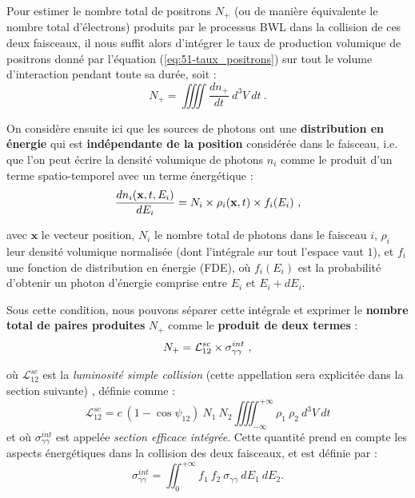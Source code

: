 \begin{refsection}
Pour estimer le nombre total de positrons $N_+$ (ou de manière équivalente le nombre total d'électrons) produits par le processus BWL dans la collision de ces deux faisceaux, il nous suffit alors d'intégrer le taux de production volumique de positrons donné par l'équation (\ref{eq:51-taux_positrons}) sur tout le volume d'interaction pendant toute sa durée, soit :
\begin{equation}
N_+ = \iiiint \dfrac{d n_+}{dt} ~ d^3V ~ dt ~ .
\end{equation}

On considère ensuite ici que les sources de photons ont une \textbf{distribution en énergie} qui est \textbf{indépendante de la position} considérée dans le faisceau, i.e. que l'on peut écrire la densité volumique de photons $n_i$ comme le produit d'un terme spatio-temporel avec un terme énergétique :
\begin{equation}
    \dfrac{dn_i(\textbf{x}, t, E_i)}{dE_i} = N_i \times \rho_i (\textbf{x}, t) \times f_i (E_i) ~ \rm ,
\end{equation}

avec $\textbf{x}$ le vecteur position, $N_i$ le nombre total de photons dans le faisceau $i$, $\rho_i$ leur densité volumique normalisée (dont l'intégrale sur tout l'espace vaut $1$), et $f_i$ une fonction de distribution en énergie (FDE), où $f_i(E_i)$ est la probabilité d'obtenir un photon d'énergie comprise entre $E_i$ et $E_i+dE_i$.

Sous cette condition, nous pouvons séparer cette intégrale et exprimer le \textbf{nombre total de paires produites} $N_+$ comme le \textbf{produit de deux termes} :
\begin{equation}
    N_+ = \mathcal{L}_{12}^{sc} \times \sigma_{\gamma\gamma}^{int} ~ \rm ,
    \label{eq:51-N+_definition}
\end{equation}

où $\mathcal{L}_{12}^{sc}$ est la \textit{luminosité simple collision} (cette appellation sera explicitée dans la section suivante) \parencite{herr_2006}, définie comme :
\begin{equation}
    \mathcal{L}_{12}^{sc} = c ~ (1-\cos{\psi_{12}}) ~ N_1 ~ N_2 \iiiint_{-\infty}^{+\infty} \rho_1 ~ \rho_2 ~ d^3 V ~ dt
    \label{eq:51-luminosite_definition}
\end{equation}
et où $\sigma_{\gamma\gamma}^{int}$ est appelée \textit{section efficace intégrée}. Cette quantité prend en compte les aspects énergétiques dans la collision des deux faisceaux, et est définie par :
\begin{equation}
    \sigma_{\gamma\gamma}^{int} = \iint_{0}^{+\infty} f_1 ~ f_2 ~ \sigma_{\gamma\gamma} ~ dE_1 ~ dE_2.
    \label{eq:51-sigma_int_definition}
\end{equation}


\end{refsection}
